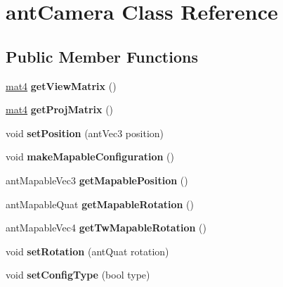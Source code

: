 \hypertarget{classant_camera}{\section{ant\+Camera Class Reference}
\label{classant_camera}
}
\subsection*{Public Member Functions}
\begin{DoxyCompactItemize}
\item 
\hypertarget{classant_camera_afc306c4adfde275b49c735ae68ee857e}{\hyperlink{structmat4}{mat4} {\bfseries get\+View\+Matrix} ()}\label{classant_camera_afc306c4adfde275b49c735ae68ee857e}

\item 
\hypertarget{classant_camera_a91398d63af3a186225ecb1d788b4b6d4}{\hyperlink{structmat4}{mat4} {\bfseries get\+Proj\+Matrix} ()}\label{classant_camera_a91398d63af3a186225ecb1d788b4b6d4}

\item 
\hypertarget{classant_camera_a02249b4eec2ba04abd37fe9ca24ddae5}{void {\bfseries set\+Position} (ant\+Vec3 position)}\label{classant_camera_a02249b4eec2ba04abd37fe9ca24ddae5}

\item 
\hypertarget{classant_camera_a30dc5c33dead1b3fa33ed3c64676a764}{void {\bfseries make\+Mapable\+Configuration} ()}\label{classant_camera_a30dc5c33dead1b3fa33ed3c64676a764}

\item 
\hypertarget{classant_camera_ad0d1a175f16a355be70dead02f304ec6}{ant\+Mapable\+Vec3 {\bfseries get\+Mapable\+Position} ()}\label{classant_camera_ad0d1a175f16a355be70dead02f304ec6}

\item 
\hypertarget{classant_camera_a96dd6880d5332a4819104d50003c1a9c}{ant\+Mapable\+Quat {\bfseries get\+Mapable\+Rotation} ()}\label{classant_camera_a96dd6880d5332a4819104d50003c1a9c}

\item 
\hypertarget{classant_camera_a4442ebbbcc76ddc695085f2a8dffb555}{ant\+Mapable\+Vec4 {\bfseries get\+Tw\+Mapable\+Rotation} ()}\label{classant_camera_a4442ebbbcc76ddc695085f2a8dffb555}

\item 
\hypertarget{classant_camera_a2d05ef34b8057eaefd6a684d57cacbaa}{void {\bfseries set\+Rotation} (ant\+Quat rotation)}\label{classant_camera_a2d05ef34b8057eaefd6a684d57cacbaa}

\item 
\hypertarget{classant_camera_a155acb0975f1716f7e2d098799f59f6f}{void {\bfseries set\+Config\+Type} (bool type)}\label{classant_camera_a155acb0975f1716f7e2d098799f59f6f}

\end{DoxyCompactItemize}
